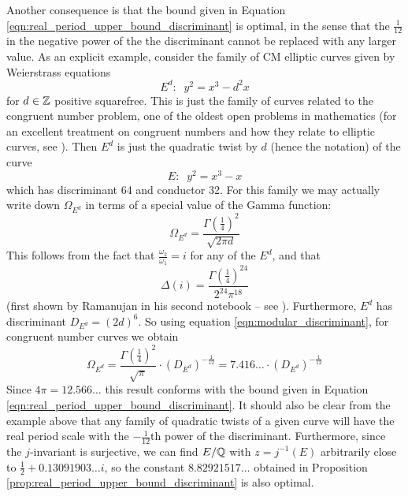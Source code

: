 Another consequence is that the bound given in Equation \ref{eqn:real_period_upper_bound_discriminant} is optimal, in the sense that the $\frac{1}{12}$ in the negative power of the the discriminant cannot be replaced with any larger value. As an explicit example, consider the family of CM elliptic curves given by Weierstrass equations
\begin{equation}
E^d: \;\; y^2 = x^3 - d^2 x
\end{equation}
for $d \in\mathbb{Z}$ positive squarefree. This is just the family of curves related to the congruent number problem, one of the oldest open problems in mathematics (for an excellent treatment on congruent numbers and how they relate to elliptic curves, see \cite{Kob-2012}). Then $E^{d}$ is just the quadratic twist by $d$ (hence the notation) of the curve
\begin{equation}
E: \;\; y^2 = x^3-x
\end{equation}
which has discriminant 64 and conductor 32. For this family we may actually write down $\Omega_{E^d}$ in terms of a special value of the Gamma function:
\begin{equation}
\Omega_{E^d} = \frac{\Gamma(\frac{1}{4})^2}{\sqrt{2\pi d}}
\end{equation}
This follows from the fact that $\frac{\omega_2}{\omega_1} = i$ for any of the $E^d$, and that
\begin{equation}
\Delta(i) = \frac{\Gamma(\frac{1}{4})^{24}}{2^{24}\pi^{18}}
\end{equation}
(first shown by Ramanujan in his second notebook -- see \cite{BeZh-1992}). Furthermore, $E^{d}$ has discriminant $D_{E^{d}} = (2d)^6$. So using equation \ref{eqn:modular_discriminant}, for congruent number curves we obtain
\begin{equation}
\Omega_{E^d} = \frac{\Gamma(\frac{1}{4})^2}{\sqrt{\pi}} \cdot (D_{E^d})^{-\frac{1}{12}} = 7.416\ldots \cdot (D_{E^d})^{-\frac{1}{12}}
\end{equation}
Since $4\pi = 12.566\ldots$ this result conforms with the bound given in Equation \ref{eqn:real_period_upper_bound_discriminant}. It should also be clear from the example above that any family of quadratic twists of a given curve will have the real period scale with the $-\frac{1}{12}$th power of the discriminant. Furthermore, since the $j$-invariant is surjective, we can find $E/\mathbb{Q}$ with $z=j^{-1}(E)$ arbitrarily close to $\frac{1}{2}+0.13091903\ldots i$, so the constant $8.82921517\ldots$ obtained in Proposition \ref{prop:real_period_upper_bound_discriminant} is also optimal. \\

